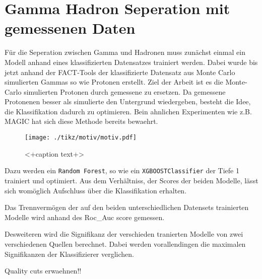 \chapter{Gamma Hadron Seperation mit gemessenen Daten}
Für die Seperation zwischen Gamma und Hadronen muss zunächst einmal ein Modell anhand eines klassifizierten Datensatzes trainiert werden.
Dabei wurde bis jetzt anhand der FACT-Tools \cite{FACT-Tools} der klassifizierte Datensatz aus Monte Carlo simulierten Gammas so wie Protonen erstellt. 
Ziel der Arbeit ist es die Monte-Carlo simulierten Protonen durch gemessene zu ersetzen.
Da gemessene Protonenen besser als simulierte den Untergrund wiedergeben, besteht die Idee, die Klassifikation dadurch zu optimieren.
Bein ahnlichen Experimenten wie z.B. MAGIC hat sich diese Methode bereits bewaehrt. 
\begin{figure}[H]
  \centering
  \texttt{[image: ./tikz/motiv/motiv.pdf]}
  \caption{<+caption text+>}
  \label{fig:<+label+>}
\end{figure}
Dazu werden ein \texttt{Random Forest}, so wie ein \texttt{XGBOOSTClassifier} der Tiefe 1 trainiert und optimiert.
Aus dem Verhältniss, der Scores der beiden Modelle, lässt sich womöglich Aufschluss über die Klassifikation erhalten.

Das Trennvermögen der auf den beiden unterschiedlichen Datensets trainierten Modelle wird anhand des Roc\_Auc score gemessen.

Desweiteren wird die Signifikanz der verschieden tranierten Modelle von zwei verschiedenen Quellen berechnet. 
Dabei werden vorallendingen die maximalen Signifikanzen der Klassifizierer verglichen.


Quality cuts erwaehnen!!

